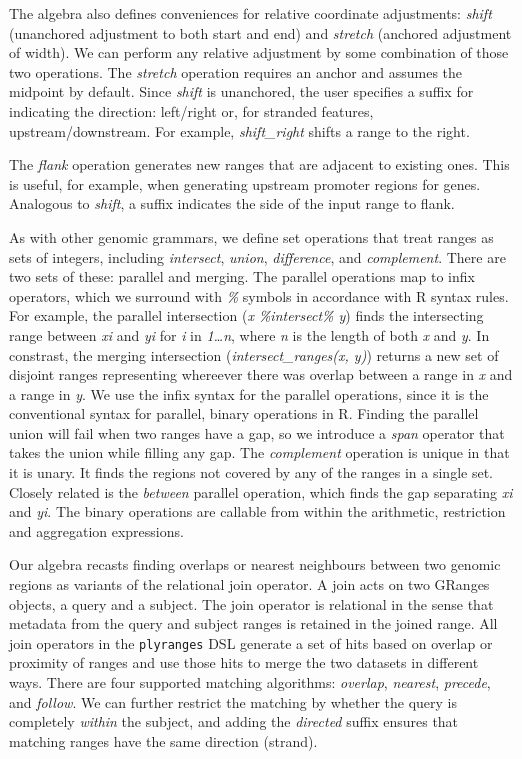 \documentclass[10pt,letterpaper]{article}
\begin{document}
The algebra also defines conveniences for relative coordinate
adjustments: \emph{shift} (unanchored adjustment to both start and end)
and \emph{stretch} (anchored adjustment of width). We can perform any
relative adjustment by some combination of those two operations. The
\emph{stretch} operation requires an anchor and assumes the midpoint by
default. Since \emph{shift} is unanchored, the user specifies a suffix
for indicating the direction: left/right or, for stranded features,
upstream/downstream. For example, \emph{shift\_right} shifts a range to
the right.

The \emph{flank} operation generates new ranges that are adjacent to
existing ones. This is useful, for example, when generating upstream
promoter regions for genes. Analogous to \emph{shift}, a suffix
indicates the side of the input range to flank.

As with other genomic grammars, we define set operations that treat
ranges as sets of integers, including \emph{intersect}, \emph{union},
\emph{difference}, and \emph{complement}. There are two sets of these:
parallel and merging. The parallel operations map to infix operators,
which we surround with \emph{\%} symbols in accordance with R syntax
rules. For example, the parallel intersection (\emph{x \%intersect\% y})
finds the intersecting range between \emph{xi} and \emph{yi} for
\emph{i} in \emph{1\ldots{}n}, where \emph{n} is the length of both
\emph{x} and \emph{y}. In constrast, the merging intersection
(\emph{intersect\_ranges(x, y)}) returns a new set of disjoint ranges
representing whereever there was overlap between a range in \emph{x} and
a range in \emph{y}. We use the infix syntax for the parallel
operations, since it is the conventional syntax for parallel, binary
operations in R. Finding the parallel union will fail when two ranges
have a gap, so we introduce a \emph{span} operator that takes the union
while filling any gap. The \emph{complement} operation is unique in that
it is unary. It finds the regions not covered by any of the ranges in a
single set. Closely related is the \emph{between} parallel operation,
which finds the gap separating \emph{xi} and \emph{yi}. The binary
operations are callable from within the arithmetic, restriction and
aggregation expressions.

Our algebra recasts finding overlaps or nearest neighbours between two
genomic regions as variants of the relational join operator. A join acts
on two GRanges objects, a query and a subject. The join operator is
relational in the sense that metadata from the query and subject ranges
is retained in the joined range. All join operators in the
\texttt{plyranges} DSL generate a set of hits based on overlap or
proximity of ranges and use those hits to merge the two datasets in
different ways. There are four supported matching algorithms:
\emph{overlap}, \emph{nearest}, \emph{precede}, and \emph{follow}. We
can further restrict the matching by whether the query is completely
\emph{within} the subject, and adding the \emph{directed} suffix ensures
that matching ranges have the same direction (strand).
\end{document}
